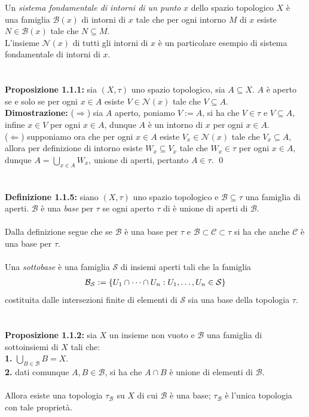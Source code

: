 \documentclass{article}
\begin{document}
Un \textit{sistema fondamentale di intorni di un punto} $x$ dello spazio topologico $X$ è una famiglia $\mathcal{B}(x)$ di intorni di $x$ tale che per ogni intorno $M$ di $x$ esiste $N \in \mathcal{B}(x)$ tale che $N \subseteq M$. \\
L'insieme $\mathcal{N}(x)$ di tutti gli intorni di $x$ è un particolare esempio di sistema fondamentale di intorni di $x$. \\ \\ \\
\textbf{Proposizione 1.1.1:} sia $(X, \tau)$ uno spazio topologico, sia $A \subseteq X$. $A$ è aperto se e solo se per ogni $x \in A$ esiste $V \in \mathcal{N}(x)$ tale che $V \subseteq A$. \\

\textbf{Dimostrazione:} ($\Rightarrow$) sia $A$ aperto, poniamo $V := A$, si ha che $V \in \tau$ e $V \subseteq A$, infine $x \in V$ per ogni $x \in A$, dunque $A$ è un intorno di $x$ per ogni $x \in A$. \\
($\Leftarrow$) supponiamo ora che per ogni $x \in A$ esiste $V_x \in \mathcal{N}(x)$ tale che $V_x \subseteq A$, allora per definizione di intorno esiste $W_x \subseteq V_x$ tale che $W_x \in \tau$ per ogni $x \in A$, dunque $A = \bigcup_{x \in A} W_x$, unione di aperti, pertanto $A \in \tau$. \qed \\ \\ \\
\textbf{Definizione 1.1.5:} siano $(X, \tau)$ uno spazio topologico e $\mathcal{B} \subseteq \tau$ una famiglia di aperti. $\mathcal{B}$ è una \textit{base} per $\tau$ se ogni aperto $\tau$ di è unione di aperti di $\mathcal{B}$. \\ \\
Dalla definizione segue che se $\mathcal{B}$ è una base per $\tau$ e $\mathcal{B} \subset \mathcal{C} \subset \tau$ si ha che anche $\mathcal{C}$ è una base per $\tau$. \\ \\
Una \textit{sottobase} è una famiglia $\mathcal{S}$ di insiemi aperti tali che la famiglia
\begin{gather}
    \mathcal{B}_\mathcal{S} := \{ U_1 \cap \dots \cap U_n : U_1, \dots , U_n \in \mathcal{S} \} \notag
\end{gather}
costituita dalle intersezioni finite di elementi di $\mathcal{S}$ sia una base della topologia $\tau$. \\ \\ \\
\textbf{Proposizione 1.1.2:} sia $X$ un insieme non vuoto e $\mathcal{B}$ una famiglia di sottoinsiemi di $X$ tali che: \\
\textbf{1.} $\bigcup_{B \in \mathcal{B}} B = X$. \\
\textbf{2.} dati comunque $A, B \in \mathcal{B}$, si ha che $A \cap B$ è unione di elementi di $\mathcal{B}$. \\ \\
Allora esiste una topologia $\tau_\mathcal{B}$ su $X$ di cui $\mathcal{B}$ è una base; $\tau_\mathcal{B}$ è l'unica topologia con tale proprietà. \\
\end{document}
